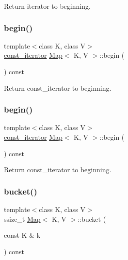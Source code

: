 Return iterator to beginning. \mbox{\label{classMap_ae14bb8eaf9dffd6b75b8cc0df481836a}} 
\subsubsection{\texorpdfstring{begin()}{begin()}\hspace{0.1cm}{\footnotesize\ttfamily [3/4]}}
{\footnotesize\ttfamily template$<$class K, class V$>$ \\
\hyperlink{classMap_add90fe1e25806ba6f6278b264e78ee9a}{const\+\_\+iterator} \hyperlink{classMap}{Map}$<$ K, V $>$\+::begin (\begin{DoxyParamCaption}{ }\end{DoxyParamCaption}) const\hspace{0.3cm}{\ttfamily [inline]}}

Return const\+\_\+iterator to beginning. \mbox{\label{classMap_ae14bb8eaf9dffd6b75b8cc0df481836a}} 
\subsubsection{\texorpdfstring{begin()}{begin()}\hspace{0.1cm}{\footnotesize\ttfamily [4/4]}}
{\footnotesize\ttfamily template$<$class K, class V$>$ \\
\hyperlink{classMap_add90fe1e25806ba6f6278b264e78ee9a}{const\+\_\+iterator} \hyperlink{classMap}{Map}$<$ K, V $>$\+::begin (\begin{DoxyParamCaption}{ }\end{DoxyParamCaption}) const\hspace{0.3cm}{\ttfamily [inline]}}

Return const\+\_\+iterator to beginning. \mbox{\label{classMap_afb67ba82e34168ef9cc2c093e0782aee}} 
\subsubsection{\texorpdfstring{bucket()}{bucket()}\hspace{0.1cm}{\footnotesize\ttfamily [1/2]}}
{\footnotesize\ttfamily template$<$class K, class V$>$ \\
ssize\+\_\+t \hyperlink{classMap}{Map}$<$ K, V $>$\+::bucket (\begin{DoxyParamCaption}\item[{const K \&}]{k }\end{DoxyParamCaption}) const\hspace{0.3cm}{\ttfamily [inline]}}

